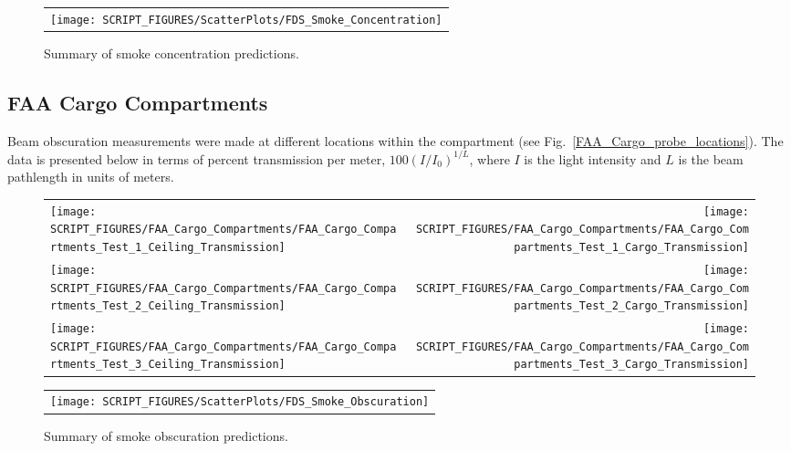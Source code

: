\begin{figure}[p]
\begin{center}
\begin{tabular}{c}
\texttt{[image: SCRIPT\_FIGURES/ScatterPlots/FDS\_Smoke\_Concentration]}
\end{tabular}
\end{center}
\caption[Summary of smoke concentration predictions]{Summary of smoke concentration predictions.}
\end{figure}

\clearpage

\subsection{FAA Cargo Compartments}

Beam obscuration measurements were made at different locations within the compartment (see Fig.~\ref{FAA_Cargo_probe_locations}). The data is presented below in terms of percent transmission per meter, $100(I/I_0)^{1/L}$, where $I$ is the light intensity and $L$ is the beam pathlength in units of meters.

\begin{figure}[h!]
\begin{tabular*}{\textwidth}{l@{\extracolsep{\fill}}r}
\texttt{[image: SCRIPT\_FIGURES/FAA\_Cargo\_Compartments/FAA\_Cargo\_Compartments\_Test\_1\_Ceiling\_Transmission]} &
\texttt{[image: SCRIPT\_FIGURES/FAA\_Cargo\_Compartments/FAA\_Cargo\_Compartments\_Test\_1\_Cargo\_Transmission]} \\
\texttt{[image: SCRIPT\_FIGURES/FAA\_Cargo\_Compartments/FAA\_Cargo\_Compartments\_Test\_2\_Ceiling\_Transmission]} &
\texttt{[image: SCRIPT\_FIGURES/FAA\_Cargo\_Compartments/FAA\_Cargo\_Compartments\_Test\_2\_Cargo\_Transmission]} \\
\texttt{[image: SCRIPT\_FIGURES/FAA\_Cargo\_Compartments/FAA\_Cargo\_Compartments\_Test\_3\_Ceiling\_Transmission]} &
\texttt{[image: SCRIPT\_FIGURES/FAA\_Cargo\_Compartments/FAA\_Cargo\_Compartments\_Test\_3\_Cargo\_Transmission]}
\end{tabular*}
\end{figure}

\newpage

\begin{figure}[p]
\begin{center}
\begin{tabular}{c}
\texttt{[image: SCRIPT\_FIGURES/ScatterPlots/FDS\_Smoke\_Obscuration]}
\end{tabular}
\end{center}
\caption[Summary of smoke obscuration predictions]{Summary of smoke obscuration predictions.}
\end{figure}


